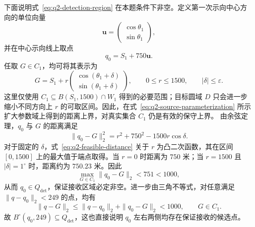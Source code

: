 下面说明式~\eqref{eq:q2-detection-region} 在本题条件下非空。定义第一次示向中心方向的单位向量
\begin{equation}
  \mathbf u=
  \begin{pmatrix}
    \cos\theta_1\\
    \sin\theta_1
  \end{pmatrix},
  \label{eq:q2-center-direction}
\end{equation}
并在中心示向线上取点
\begin{equation}
  q_0=S_1+750\mathbf u.
  \label{eq:q2-feasible-point}
\end{equation}
任取 $G\in C_1$，均可将其表示为
\begin{equation}
  G=S_1+r
  \begin{pmatrix}
    \cos(\theta_1+\delta)\\
    \sin(\theta_1+\delta)
  \end{pmatrix},
  \qquad 0\leq r\leq1500,\qquad |\delta|\leq\varepsilon.
  \label{eq:q2-source-parameterization}
\end{equation}
这里仅使用 $C_1\subseteq B(S_1,1500)\cap W_1$ 得到的必要范围；目标圆域 $D$ 只会进一步缩小不同方向上 $r$ 的可取区间。因此，在式~\eqref{eq:q2-source-parameterization} 所示扩大参数域上得到的距离上界，对真实集合 $C_1$ 仍是有效的保守上界。
由余弦定理，$q_0$ 与 $G$ 的距离满足
\begin{equation}
  \|q_0-G\|_2^2
  =r^2+750^2-1500r\cos\delta.
  \label{eq:q2-feasible-distance}
\end{equation}
对于固定的 $\delta$，式~\eqref{eq:q2-feasible-distance} 关于 $r$ 为凸二次函数，其在区间 $[0,1500]$ 上的最大值于端点取得。当 $r=0$ 时距离为 $750$ 米；当 $r=1500$ 且 $|\delta|=1^\circ$ 时，距离约为 $750.23$ 米。因此
\begin{equation}
  \max_{G\in C_1}\|q_0-G\|_2<751<1000,
  \label{eq:q2-nonempty-proof}
\end{equation}
从而 $q_0\in Q_{\mathrm{det}}$，保证接收区域必定非空。进一步由三角不等式，对任意满足 $\|q-q_0\|_2<249$ 的点，均有
\[
  \|q-G\|_2
  \leq\|q-q_0\|_2+\|q_0-G\|_2<1000,
  \qquad G\in C_1.
\]
故 $B^\circ(q_0,249)\subseteq Q_{\mathrm{det}}$，这也直接说明 $q_0$ 左右两侧均存在保证接收的候选点。

